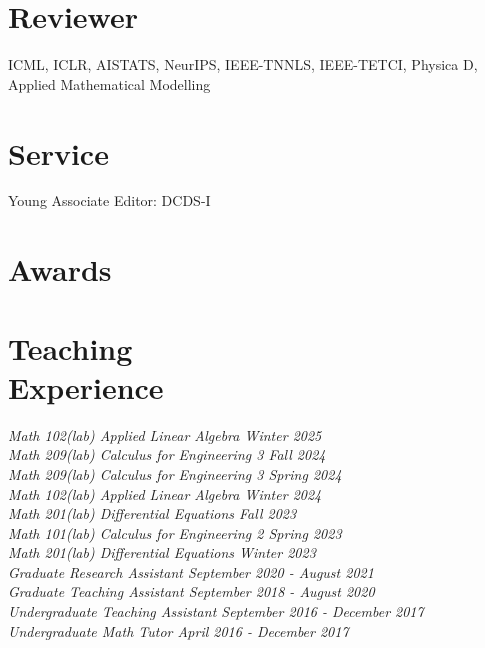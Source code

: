 \documentclass[margin]{res}
\begin{document}
\begin{resume}
\section{Reviewer}

ICML, ICLR, AISTATS, NeurIPS, IEEE-TNNLS, IEEE-TETCI, Physica D, Applied Mathematical Modelling

\section{Service}
Young Associate Editor: DCDS-I


\section{Awards}


\section{Teaching\\Experience}

\textsl{Math 102(lab) Applied Linear Algebra \hfill{Winter 2025}\\}
\textsl{Math 209(lab) Calculus for Engineering 3 \hfill{Fall 2024}\\}
\textsl{Math 209(lab) Calculus for Engineering 3 \hfill{Spring 2024}\\}
\textsl{Math 102(lab) Applied Linear Algebra \hfill{Winter 2024}\\}
\textsl{Math 201(lab) Differential Equations \hfill{Fall 2023}\\}
\textsl{Math 101(lab) Calculus for Engineering 2 \hfill{Spring 2023}\\}
\textsl{Math 201(lab) Differential Equations \hfill{Winter 2023}\\}
\textsl{Graduate Research Assistant \hfill{September 2020 - August 2021}\\}
\textsl{Graduate Teaching Assistant \hfill{September 2018 - August 2020}\\}
\textsl{Undergraduate Teaching Assistant \hfill{September 2016 - December 2017}\\}
\textsl{Undergraduate Math Tutor \hfill{April 2016 - December 2017}\\}






\end{resume}
\(\)
\end{document}
